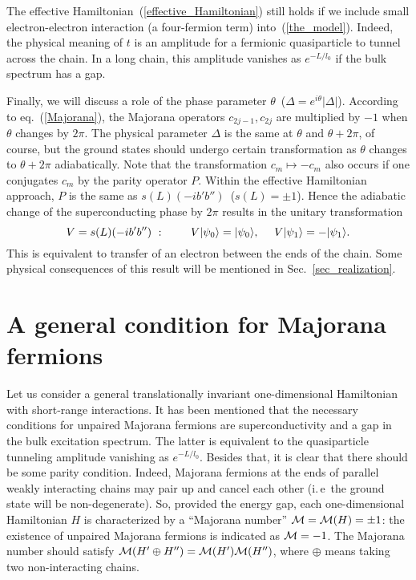 The effective Hamiltonian~(\ref{effective_Hamiltonian}) still holds if we
include small electron-electron interaction (a four-fermion term)
into~(\ref{the_model}).  Indeed, the physical meaning of $t$ is an amplitude
for a fermionic quasiparticle to tunnel across the chain. In a long chain,
this amplitude vanishes as $e^{-L/l_0}$ if the bulk spectrum has a gap.

Finally, we will discuss a role of the phase parameter $\theta$\,
($\Delta=e^{i\theta}|\Delta|$). According to eq.~(\ref{Majorana}), the
Majorana operators $c_{2j-1},c_{2j}$ are multiplied by $-1$ when $\theta$
changes by $2\pi$. The physical parameter $\Delta$ is the same at $\theta$ and
$\theta+2\pi$, of course, but the ground states should undergo certain
transformation as $\theta$ changes to $\theta+2\pi$ adiabatically. Note that
the transformation $c_m\mapsto-c_m$ also occurs if one conjugates $c_m$ by the
parity operator $P$. Within the effective Hamiltonian approach, $P$ is the
same as $s(L)(-ib'b'')$\, ($s(L)=\pm 1$). Hence the adiabatic change of the
superconducting phase by $2\pi$ results in the unitary transformation
\begin{equation}\label{V}
V=s(L)(-ib'b'')\ :\qquad\
V|\psi_0\rangle=|\psi_0\rangle,\quad\
V|\psi_1\rangle=-|\psi_1\rangle.
\end{equation}
This is equivalent to transfer of an electron between the ends of the
chain. Some physical consequences of this result will be mentioned in
Sec.~\ref{sec_realization}.


\section{A general condition for Majorana fermions}\label{sec_condition}

Let us consider a general translationally invariant one-dimensional
Hamiltonian with short-range interactions. It has been mentioned that the
necessary conditions for unpaired Majorana fermions are superconductivity and
a gap in the bulk excitation spectrum. The latter is equivalent to the
quasiparticle tunneling amplitude vanishing as $e^{-L/l_0}$. Besides that, it
is clear that there should be some parity condition. Indeed, Majorana fermions
at the ends of parallel weakly interacting chains may pair up and cancel each
other (i.\,e\ the ground state will be non-degenerate). So, provided the
energy gap, each one-dimensional Hamiltonian $H$ is characterized by a
``Majorana number'' ${\cal M}={\cal M}(H)=\pm 1$: the existence of unpaired Majorana
fermions is indicated as ${\cal M}=-1$. The Majorana number should satisfy
${\cal M}(H'\oplus H'')={\cal M}(H'){\cal M}(H'')$, where $\oplus$ means taking two
non-interacting chains.

